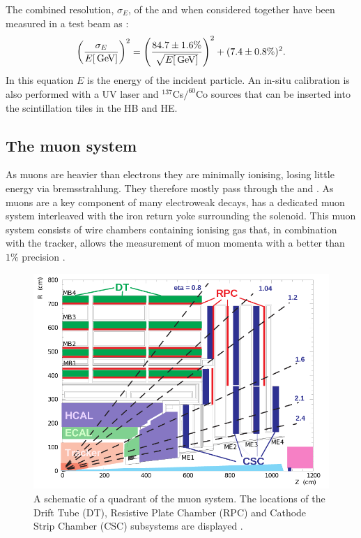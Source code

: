 The combined resolution, $\sigma_E$, of the \ECAL and \HCAL when
considered together have been measured in a test beam as
\cite{Abdullin:2008zzb}: 
\begin{equation} \label{eq:hcalres}
\left(\frac{\sigma_E}{E[\mathrm{\,Ge\kern -0.1em V}]}\right)^2=\left(\frac{84.7\pm1.6\%}
{\sqrt{E[\mathrm{\,Ge\kern -0.1em V}]}}\right)^2+(7.4\pm0.8\%)^2.  
\end{equation} 
In this equation $E$ is the energy of the incident particle. An
in-situ calibration is also performed with a UV laser and
$^{137}$Cs$/^{60}$Co sources that can be inserted into the scintillation
tiles in the \ac{HB} and \ac{HE}.

\subsection{The muon system} 

As muons are heavier than electrons they are minimally ionising,
losing little energy via bremsstrahlung. They therefore mostly pass
through the \ECAL and \HCAL. As muons are a key component of many
electroweak decays, \CMS has a dedicated muon system interleaved with
the iron return yoke surrounding the solenoid. This muon system
consists of wire chambers containing ionising gas that, in combination
with the tracker, allows the measurement of muon momenta with a
better than $1\%$ precision \cite{CMS:1997dma}.

\begin{figure}
\begin{center}
\includegraphics[width=0.8\linewidth]{figs/cms_muon} \end{center}
\caption{ A schematic of a quadrant of the \CMS muon system. The
locations of the Drift Tube (DT), Resistive Plate Chamber (RPC) and
Cathode Strip Chamber (CSC) subsystems are displayed
\cite{Kim:2012ix}.}
\label{fig:muon} \end{figure}

